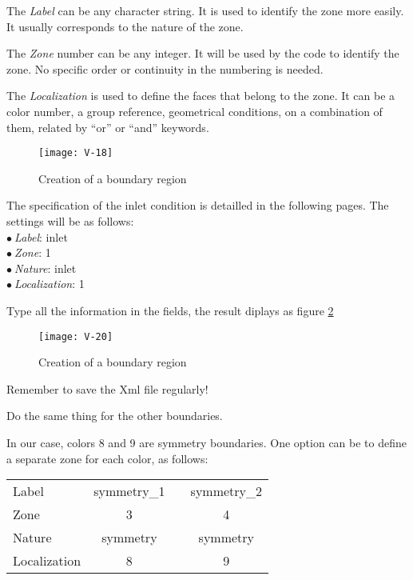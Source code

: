 The {\itshape Label} can be any character string. It is used to identify the
zone more easily. It usually corresponds to the nature of the zone.

The {\itshape Zone} number can be any integer. It will be used by the code to
identify the zone. No specific order or continuity in the numbering is needed.

The {\itshape Localization} is used to define the faces that belong to the
zone. It can be a color number, a group reference, geometrical conditions, on a
combination of them, related by ``or'' or ``and'' keywords.

\begin{figure}[ht]
\begin{center}
\texttt{[image: V-18]}
\caption{Creation of a boundary region}
\label{fig21_e1}
\end{center}
\end{figure}


\clearpage
The specification of the inlet condition is detailled in the following
pages. The settings will be as follows:\\
\hspace*{1cm}$\bullet\ ${\itshape Label}: inlet\\
\hspace*{1cm}$\bullet\ ${\itshape Zone}: 1\\
\hspace*{1cm}$\bullet\ ${\itshape Nature}: inlet\\
\hspace*{1cm}$\bullet\ ${\itshape Localization}: 1

Type all the information in the fields, the result diplays as figure \ref{fig20_e1}

\begin{figure}[ht]
\begin{center}
\texttt{[image: V-20]}
\caption{Creation of a boundary region}
\label{fig20_e1}
\end{center}
\end{figure}

Remember to save the Xml file regularly!


\clearpage
Do the same thing for the other boundaries.

In our case, colors 8 and 9 are symmetry boundaries. One option can be to define
a separate zone for each color, as follows:
\begin{center}
\begin{tabular}{lcp{2cm}c}
Label & symmetry\_1 & & symmetry\_2 \\
Zone & 3 & & 4 \\
Nature & symmetry & & symmetry \\
Localization & 8 & & 9 \\
\end{tabular}
\end{center}

